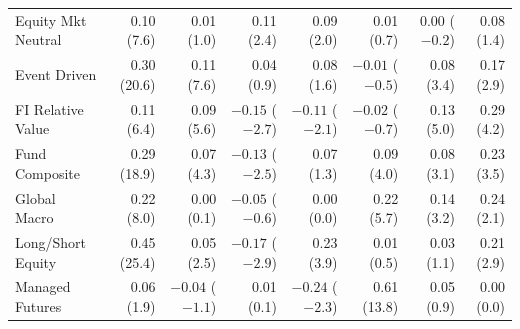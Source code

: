 \documentclass[11pt]{article}
\begin{document}
\begin{table}[H]
{\begin{tabular}{lrrrrrrr}
Equity Mkt Neutral& 0.10 (7.6) & 0.01 (1.0) & 0.11 (2.4) & 0.09 (2.0) & 0.01 (0.7) & 0.00 ($-0.2$) & 0.08 (1.4)\\
Event Driven      & 0.30 (20.6) & 0.11 (7.6) & 0.04 (0.9) & 0.08 (1.6) & $-0.01$ ($-0.5$) & 0.08 (3.4) & 0.17 (2.9)\\
FI Relative Value & 0.11 (6.4) & 0.09 (5.6) & $-0.15$ ($-2.7$) & $-0.11$ ($-2.1$) & $-0.02$ ($-0.7$) & 0.13 (5.0) & 0.29 (4.2)\\
Fund Composite    & 0.29 (18.9) & 0.07 (4.3) & $-0.13$ ($-2.5$) & 0.07 (1.3) & 0.09 (4.0) & 0.08 (3.1) & 0.23 (3.5)\\
Global Macro      & 0.22 (8.0) & 0.00 (0.1) & $-0.05$ ($-0.6$) & 0.00 (0.0) & 0.22 (5.7) & 0.14 (3.2) & 0.24 (2.1)\\
Long/Short Equity & 0.45 (25.4) & 0.05 (2.5) & $-0.17$ ($-2.9$) & 0.23 (3.9) & 0.01 (0.5) & 0.03 (1.1) & 0.21 (2.9)\\
Managed Futures   & 0.06 (1.9) & $-0.04$ ($-1.1$) & 0.01 (0.1) & $-0.24$ ($-2.3$) & 0.61 (13.8) & 0.05 (0.9) & 0.00 (0.0)\\
\bottomrule
\end{tabular}}
\end{table}
\end{document}
